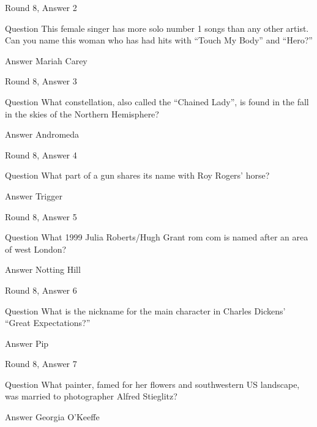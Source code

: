 \documentclass[11pt]{beamer}
\begin{document}
\begin{frame}{Round 8, Answer 2}
\begin{block}{Question}
This female singer has more solo number 1 songs than any other artist. Can you name this woman who has had hits with ``Touch My Body'' and ``Hero?''
\end{block}
\pause{}
\begin{block}{Answer}
Mariah Carey
\end{block}
\end{frame}
    

\begin{frame}{Round 8, Answer 3}
\begin{block}{Question}
What constellation, also called the ``Chained Lady'', is found in the fall in the skies of the Northern Hemisphere\@?
\end{block}
\pause{}
\begin{block}{Answer}
Andromeda
\end{block}
\end{frame}
    

\begin{frame}{Round 8, Answer 4}
\begin{block}{Question}
What part of a gun shares its name with Roy Rogers' horse\@?
\end{block}
\pause{}
\begin{block}{Answer}
Trigger
\end{block}
\end{frame}
    

\begin{frame}{Round 8, Answer 5}
\begin{block}{Question}
What 1999 Julia Roberts/Hugh Grant rom com is named after an area of west London\@?
\end{block}
\pause{}
\begin{block}{Answer}
Notting Hill
\end{block}
\end{frame}
    

\begin{frame}{Round 8, Answer 6}
\begin{block}{Question}
What is the nickname for the main character in Charles Dickens' ``Great Expectations?''
\end{block}
\pause{}
\begin{block}{Answer}
Pip
\end{block}
\end{frame}
    

\begin{frame}{Round 8, Answer 7}
\begin{block}{Question}
What painter, famed for her flowers and southwestern US landscape, was married to photographer Alfred Stieglitz\@?
\end{block}
\pause{}
\begin{block}{Answer}
Georgia O'Keeffe
\end{block}
\end{frame}
    
\end{document}

